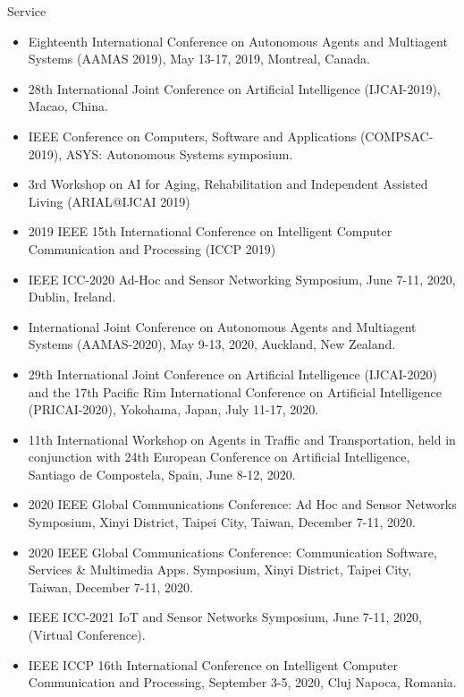 \begin{category}{Service}
\begin{itemize}
\item Eighteenth International Conference on Autonomous Agents and Multiagent Systems (AAMAS 2019), May 13-17, 2019, Montreal, Canada.

\item 28th International Joint Conference on Artificial Intelligence (IJCAI-2019), Macao, China.

\item IEEE Conference on Computers, Software and Applications (COMPSAC-2019), ASYS: Autonomous Systems symposium.

\item 3rd Workshop on AI for Aging, Rehabilitation and Independent
Assisted Living (ARIAL@IJCAI 2019)

\item 2019 IEEE 15th International Conference on Intelligent Computer
Communication and Processing (ICCP 2019)

\item IEEE ICC-2020 Ad-Hoc and Sensor Networking Symposium, June 7-11, 2020, Dublin, Ireland.

\item International Joint Conference on Autonomous Agents and Multiagent Systems (AAMAS-2020), May 9-13, 2020, Auckland, New Zealand.

\item  29th International Joint Conference on Artificial Intelligence (IJCAI-2020) and the 17th Pacific Rim International Conference on Artificial Intelligence (PRICAI-2020),  Yokohama, Japan, July 11-17, 2020.

\item 11th International Workshop on Agents in Traffic and Transportation, held in conjunction with 24th European Conference on Artificial Intelligence, Santiago de Compostela, Spain, June 8-12, 2020.

\item 2020 IEEE Global Communications Conference: Ad Hoc and Sensor Networks Symposium, Xinyi District, Taipei City, Taiwan, December 7-11, 2020.

\item 2020 IEEE Global Communications Conference: Communication Software, Services \& Multimedia Apps. Symposium, Xinyi District, Taipei City, Taiwan, December 7-11, 2020.

\item IEEE ICC-2021 IoT and Sensor Networks Symposium, June 7-11, 2020, (Virtual Conference).

\item IEEE ICCP 16th International Conference on Intelligent Computer Communication and Processing, September 3-5, 2020, Cluj Napoca, Romania.


\end{itemize}
\end{category}
